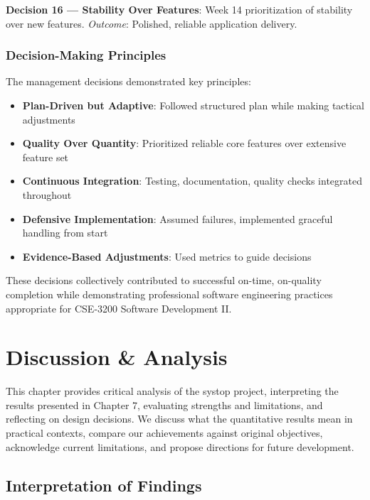 \documentclass[12pt,a4paper,oneside]{report}
\begin{document}
\textbf{Decision 16 --- Stability Over Features}: Week 14 prioritization of stability over new features. \textit{Outcome}: Polished, reliable application delivery.

\subsection{Decision-Making Principles}

The management decisions demonstrated key principles:
\begin{itemize}
    \item \textbf{Plan-Driven but Adaptive}: Followed structured plan while making tactical adjustments
    \item \textbf{Quality Over Quantity}: Prioritized reliable core features over extensive feature set
    \item \textbf{Continuous Integration}: Testing, documentation, quality checks integrated throughout
    \item \textbf{Defensive Implementation}: Assumed failures, implemented graceful handling from start
    \item \textbf{Evidence-Based Adjustments}: Used metrics to guide decisions
\end{itemize}

These decisions collectively contributed to successful on-time, on-quality completion while demonstrating professional software engineering practices appropriate for CSE-3200 Software Development II.

\chapter{Discussion \& Analysis}
\label{chap:discussion}

This chapter provides critical analysis of the systop project, interpreting the results presented in Chapter 7, evaluating strengths and limitations, and reflecting on design decisions. We discuss what the quantitative results mean in practical contexts, compare our achievements against original objectives, acknowledge current limitations, and propose directions for future development.

\section{Interpretation of Findings}
\label{sec:interpretation}
\end{document}
